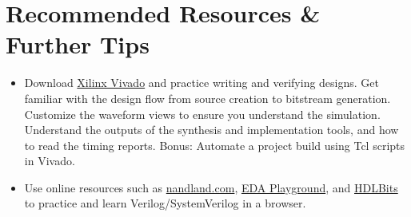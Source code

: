 \documentclass[11pt]{article}
\begin{document}
\section{Recommended Resources \& Further Tips}
\begin{itemize}
    \item Download
    \href{https://www.amd.com/en/products/software/adaptive-socs-and-fpgas/vivado.html}{Xilinx
    Vivado} and practice writing and verifying designs. Get familiar with the
    design flow from source creation to bitstream generation. Customize the
    waveform views to ensure you understand the simulation. Understand the
    outputs of the synthesis and implementation tools, and how to read the
    timing reports. Bonus: Automate a project build using Tcl scripts in
    Vivado.
    \item Use online resources such as
    \href{https://nandland.com/}{nandland.com},
    \href{https://edaplayground.com/home}{EDA Playground}, and
    \href{https://hdlbits.01xz.net/wiki/Main_Page}{HDLBits} to practice and
    learn Verilog/SystemVerilog in a browser.
\end{itemize}


\end{document}
